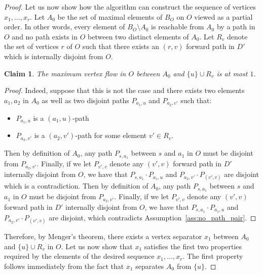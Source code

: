 \documentclass[utf8,11pt]{article}
\theoremstyle{plain}
\newtheorem{claim}{Claim}[theorem]
\theoremstyle{definition}
\begin{document}
\begin{proof}
Let us now show how the algorithm can construct the sequence of vertices $x_1, \dots, x_r$. Let $A_0$ be the set of maximal elements of $B_O$ on $O$ viewed as a partial order. In other words, every element of $B_O \setminus A_0$ is reachable from $A_0$ by a path in $O$ and no path exists in $O$ between two distinct elements of $A_0$. Let $R_v$ denote the set of vertices $r$ of $O$ such that there exists an $(r,v)$ forward path in $D'$ which is internally disjoint from $O$. 

\begin{claim}
    The maximum vertex flow in $O$ between $A_0$ and $\{u\} \cup R_v$ is at most $1$.
\end{claim}

\begin{proof}
Indeed, suppose that this is not the case and there exists two elements $a_1, a_2$ in $A_0$ as well as two disjoint paths $P_{a_1, u}$ and $P_{a_2,v'}$ such that: 
\begin{itemize}
    \item $P_{a_1, u}$ is a $(a_1,u)$-path 
    \item $P_{a_2,v'}$ is a $(a_2, v')$-path for some element $v' \in R_v$.
\end{itemize}

Then by definition of $A_0$, any path $P_{s,a_1}$ between $s$ and $a_1$ in $O$ must be disjoint from $P_{a_2,v'}$. Finally, if we let $P_{v',v}$ denote any $(v',v)$ forward path in $D'$ internally disjoint from $O$, we have that $P_{s, a_1} \cdot P_{a_1,u}$ and $P_{a_2,v'} \cdot P_{(v',v)}$ are disjoint which is a contradiction. 
Then by definition of $A_0$, any path $P_{s,a_1}$ between $s$ and $a_1$ in $O$ must be disjoint from $P_{a_2,v'}$. Finally, if we let $P_{v',v}$ denote any $(v',v)$ forward path in $D'$ internally disjoint from $O$, we have that $P_{s, a_1} \cdot P_{a_1,u}$ and $P_{a_2,v'} \cdot P_{(v',v)}$ are disjoint, which contradicts Assumption~\ref{ass:no_path_pair}. 
\end{proof}    

Therefore, by Menger's theorem, there exists a vertex separator $x_1$ between $A_0$ and $\{u\} \cup R_v$ in $O$. Let us now show that $x_1$ satisfies the first two properties required by the elements of the desired sequence $x_1, \dots, x_r$. The first property follows immediately from the fact that $x_1$ separates $A_0$ from $\{u\}$. 


\end{proof}
\end{document}

